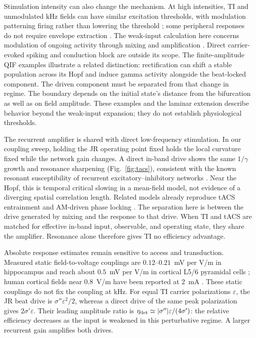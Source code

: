 \documentclass[11pt,a4paper]{article}
\newcommand{\Sig}{\sigma}
\begin{document}
Stimulation intensity can also change the mechanism. At high intensities, TI and
unmodulated kHz fields can have similar excitation thresholds, with modulation
patterning firing rather than lowering the threshold
\cite{opancar2025,semenov2025}; some peripheral responses do not require envelope
extraction \cite{peripheral2023}. The weak-input calculation here concerns
modulation of ongoing activity through mixing and amplification
\cite{vieira2024,missey2026}. Direct carrier-evoked spiking and conduction block
are outside its scope. The finite-amplitude QIF examples illustrate a related
distinction: rectification can shift a stable population across its Hopf and induce
gamma activity alongside the beat-locked component. The driven component must be
separated from that change in regime. The boundary depends on the initial state's
distance from the bifurcation as well as on field amplitude. These examples and the laminar extension describe
behavior beyond the weak-input expansion; they do not establish physiological thresholds.

The recurrent amplifier is shared with direct low-frequency stimulation. In our
coupling sweep, holding the JR operating point fixed holds the local curvature
fixed while the network gain changes. A direct in-band drive shows the same
$1/\gamma$ growth and resonance sharpening (Fig.~\ref{fig:tacs}), consistent with
the known resonant susceptibility of recurrent excitatory--inhibitory networks
\cite{ledoux2011,clusella2023}. Near the Hopf, this is temporal critical slowing
in a mean-field model, not evidence of a diverging spatial correlation length.
Related models already reproduce tACS entrainment and AM-driven phase locking
\cite{ali2013,negahbani2018,krause2023}. The separation here is between the drive
generated by mixing and the response to that drive. When TI and tACS are matched
for effective in-band input, observable, and operating state, they share the
amplifier. Resonance alone therefore gives TI no efficiency advantage.

Absolute response estimates remain sensitive to access and transduction.
Measured static field-to-voltage couplings are $0.12$--$0.21$~mV per V/m in
hippocampus \cite{bikson2004,deans2007} and reach about $0.5$~mV per V/m in cortical
L5/6 pyramidal cells \cite{radman2009}; human cortical fields near $0.8$~V/m have
been reported at $2$~mA \cite{huang2017,huang2017corr}. These static couplings do
not fix the coupling at kHz. For equal TI carrier polarizations $\varepsilon$,
the JR beat drive is $\Sig''\varepsilon^2/2$, whereas a direct drive of the same
peak polarization gives $2\Sig'\varepsilon$. Their leading amplitude ratio is
$\eta_{\rm det}\simeq|\Sig''|\varepsilon/(4\Sig')$: the relative efficiency decreases
as the input is weakened in this perturbative regime. A larger recurrent gain
amplifies both drives.
\end{document}
